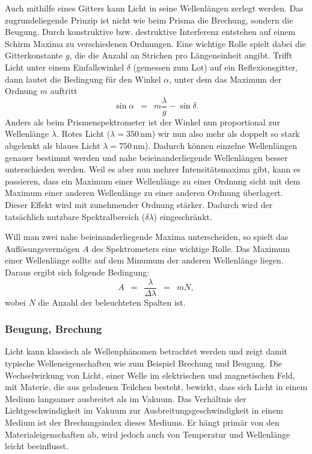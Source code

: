 \documentclass{article}
\newcommand{\widespace}{\enspace}
\newcommand{\wideeq}{\widespace = \widespace}
\newcommand{\result}[2]{
    #1 \, \text{#2}
}
\begin{document}
Auch mithilfe eines Gitters kann Licht in seine Wellenlängen zerlegt werden.
Das zugrundeliegende Prinzip ist nicht wie beim Prisma die Brechung, sondern
die Beugung. Durch konstruktive bzw. destruktive Interferenz entstehen
auf einem Schirm Maxima zu verschiedenen Ordnungen.
Eine wichtige Rolle spielt dabei die Gitterkonstante $g$, die die Anzahl
an Strichen pro Längeneinheit angibt.
Trifft Licht unter einem Einfallswinkel $\delta$ (gemessen zum Lot)
auf ein Reflexionsgitter, dann lautet die Bedingung für den Winkel $\alpha$,
unter dem das Maximum der Ordnung $m$ auftritt
\[
    \sin \alpha \wideeq m \frac \lambda g - \sin \delta.
\]
Anders als beim Prismenspektrometer ist der Winkel nun proportional zur
Wellenlänge $\lambda$. Rotes Licht ($\lambda = \result{350}{nm}$) wir nun
also mehr als doppelt so stark abgelenkt als blaues Licht 
$\lambda = \result{750}{nm}$). Dadurch können einzelne Wellenlängen genauer bestimmt
werden und nahe beieinanderliegende Wellenlängen besser unterschieden werden.
Weil es aber nun mehrer Intensitätsmaxima gibt, kann es passieren,
dass ein Maximum einer Wellenlänge zu einer Ordnung sicht mit dem
Maximum einer anderen Wellenlänge zu einer anderen Ordnung überlagert.
Dieser Effekt wird mit zunehmender Ordnung stärker. Dadurch wird der
tatsächlich nutzbare Spektralbereich ($\delta \lambda$) eingeschränkt.

Will man zwei nahe beieinanderliegende Maxima unterscheiden, so spielt das
Auflösungsvermögen $A$ des Spektrometers eine wichtige Rolle.
Das Maximum einer Wellenlänge sollte auf dem Minumum der anderen Wellenlänge
liegen. Daraus ergibt sich folgende Bedingung:
\[
    A \wideeq \frac{\lambda}{\Delta \lambda}
    \wideeq m N,
\]
wobei $N$ die Anzahl der beleuchteten Spalten ist.

\subsubsection{Beugung, Brechung}

Licht kann klassisch als Wellenphänomen betrachtet werden und zeigt
damit typische Welleneigenschaften wie zum Beispiel Brechung und Beugung.
Die Wechselwirkung von Licht, einer Welle im elektrischen und magnetischen Feld,
mit Materie, die aus geladenen Teilchen besteht, bewirkt, dass sich Licht
in einem Medium langsamer ausbreitet als im Vakuum. Das Verhältnis der
Lichtgeschwindigkeit im Vakuum zur Ausbreitungsgeschwindigkeit in einem Medium
ist der Brechungsindex dieses Mediums. Er hängt primär von den Materialeigenschaften
ab, wird jedoch auch von Temperatur und Wellenlänge leicht beeinflusst.
\end{document}
